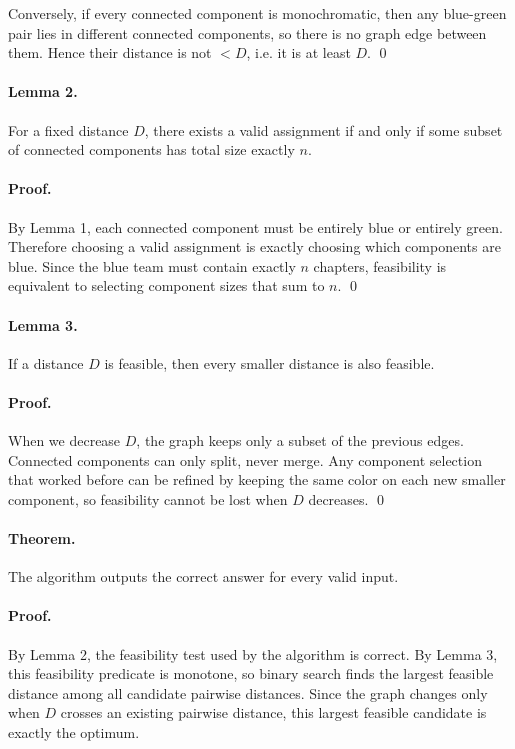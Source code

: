\documentclass[11pt]{article}
\begin{document}
Conversely, if every connected component is monochromatic, then any blue-green pair lies in different connected components, so there is no graph edge between them. Hence their distance is not $< D$, i.e. it is at least $D$. \qed

\paragraph{Lemma 2.}
For a fixed distance $D$, there exists a valid assignment if and only if some subset of connected components has total size exactly $n$.

\paragraph{Proof.}
By Lemma 1, each connected component must be entirely blue or entirely green. Therefore choosing a valid assignment is exactly choosing which components are blue. Since the blue team must contain exactly $n$ chapters, feasibility is equivalent to selecting component sizes that sum to $n$. \qed

\paragraph{Lemma 3.}
If a distance $D$ is feasible, then every smaller distance is also feasible.

\paragraph{Proof.}
When we decrease $D$, the graph keeps only a subset of the previous edges. Connected components can only split, never merge. Any component selection that worked before can be refined by keeping the same color on each new smaller component, so feasibility cannot be lost when $D$ decreases. \qed

\paragraph{Theorem.}
The algorithm outputs the correct answer for every valid input.

\paragraph{Proof.}
By Lemma 2, the feasibility test used by the algorithm is correct. By Lemma 3, this feasibility predicate is monotone, so binary search finds the largest feasible distance among all candidate pairwise distances. Since the graph changes only when $D$ crosses an existing pairwise distance, this largest feasible candidate is exactly the optimum.
\end{document}
